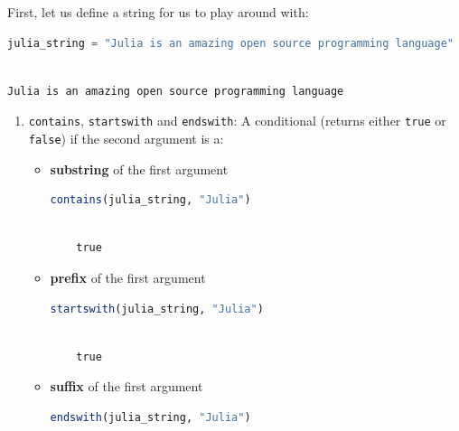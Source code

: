 \documentclass[
  notoc %
]{tufte-book}
\newcommand{\passthrough}[1]{#1}
\begin{document}
First, let us define a string for us to play around with:

\begin{lstlisting}[language=Julia]
julia_string = "Julia is an amazing open source programming language"
\end{lstlisting}

\begin{lstlisting}[language=Output]

Julia is an amazing open source programming language

\end{lstlisting}

\begin{enumerate}
\def\labelenumi{\arabic{enumi}.}
\item
  \passthrough{\lstinline!contains!},
  \passthrough{\lstinline!startswith!} and
  \passthrough{\lstinline!endswith!}: A conditional (returns either
  \passthrough{\lstinline!true!} or \passthrough{\lstinline!false!}) if
  the second argument is a:

  \begin{itemize}
  \item
    \textbf{substring} of the first argument

    \begin{lstlisting}[language=Julia]
    contains(julia_string, "Julia")
    \end{lstlisting}

    \begin{lstlisting}[language=Output]

    true

    \end{lstlisting}
  \item
    \textbf{prefix} of the first argument

    \begin{lstlisting}[language=Julia]
    startswith(julia_string, "Julia")
    \end{lstlisting}

    \begin{lstlisting}[language=Output]

    true

    \end{lstlisting}
  \item
    \textbf{suffix} of the first argument

    \begin{lstlisting}[language=Julia]
    endswith(julia_string, "Julia")
    \end{lstlisting}


\end{itemize}
\end{enumerate}
\end{document}
